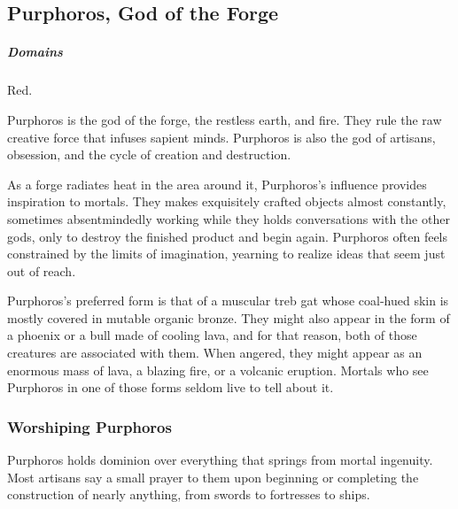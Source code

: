 \subsection*{Purphoros, God of the Forge} \label{ssec::purphoros}
    \subparagraph{Domains} Red.

    Purphoros is the god of the forge, the restless earth, and fire.
    They rule the raw creative force that infuses sapient minds.
    Purphoros is also the god of artisans, obsession, and the cycle of creation and destruction.

    As a forge radiates heat in the area around it, Purphoros's influence provides inspiration to mortals.
    They makes exquisitely crafted objects almost constantly, sometimes absentmindedly working while they holds conversations with the other gods, only to destroy the finished product and begin again.
    Purphoros often feels constrained by the limits of imagination, yearning to realize ideas that seem just out of reach.

    Purphoros's preferred form is that of a muscular treb gat whose coal-hued skin is mostly covered in mutable organic bronze.
    They might also appear in the form of a phoenix or a bull made of cooling lava, and for that reason, both of those creatures are associated with them.
    When angered, they might appear as an enormous mass of lava, a blazing fire, or a volcanic eruption.
    Mortals who see Purphoros in one of those forms seldom live to tell about it.


    \subsubsection{Worshiping Purphoros}
        Purphoros holds dominion over everything that springs from mortal ingenuity.
        Most artisans say a small prayer to them upon beginning or completing the construction of nearly anything, from swords to fortresses to ships.

